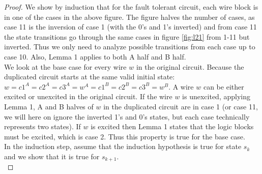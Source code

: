 \documentclass[12pt]{report}
\begin{document}
\begin{proof}
We show by induction that for the fault tolerant circuit, each wire block is in one of the cases in the above figure.  The figure halves the number of cases, as case 11 is the inversion of case 1 (with the 0's and 1's inverted) and from case 11 the state transitions go through the same cases in figure \ref{fig:l21} from 1-11 but inverted.  Thus we only need to analyze possible transitions from each case up to case 10.  Also, Lemma 1 applies to both A half and B half.\\

We look at the base case for every wire $w$ in the original circuit.  Because the duplicated circuit starts at the same valid initial state: $w=c1^A=c2^A=c3^A=w^A=c1^B=c2^B=c3^B=w^B$.  A wire $w$ can be either excited or unexcited in the original circuit. If the wire $w$ is unexcited, applying Lemma 1,  A and B halves of $w$ in the duplicated circuit are in case 1 (or case 11, we will here on ignore the inverted 1's and 0's states, but each case technically represents two states).  If $w$ is excited then Lemma 1 states that the logic blocks must be excited, which is case 2.  Thus this property is true for the base case. \\

In the induction step, assume that the induction hypothesis is true for state $s_k$ and we show that it is true for $s_{k+1}$.  \\


\end{proof}
\end{document}
